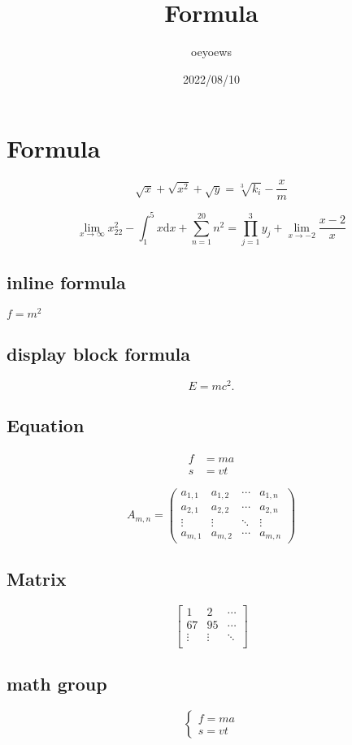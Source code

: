\documentclass{article}
\title{Formula}
\author{oeyoews}
\date{2022/08/10}
\begin{document}
\maketitle

\section{ Formula}%
\label{sec:Forum}

\[
	\sqrt{x} + \sqrt{x^2} +\sqrt{y} = \sqrt[3]{k_i} - \frac{x}{m}
\]

$$  \lim_{x \to \infty} x^2_{22} - \int_{1}^{5}x\mathrm{d}x + \sum_{n=1}^{20} n^{2} = \prod_{j=1}^{3} y_{j}  + \lim_{x \to -2} \frac{x-2}{x} $$

\subsection{inline formula}%
\label{sub:inline forum}

$f = m^2$

\subsection{display block formula}%
\label{sub:display block forum}

\[
	E = mc^2
	.\]

\subsection{Equation}%
\label{sec:equation}

\begin{align}
	f & = ma \\
	s & = vt
\end{align}

\begin{equation}
	A_{m,n} =
	\begin{pmatrix}
		a_{1,1} & a_{1,2} & \cdots & a_{1,n} \\
		a_{2,1} & a_{2,2} & \cdots & a_{2,n} \\
		\vdots  & \vdots  & \ddots & \vdots  \\
		a_{m,1} & a_{m,2} & \cdots & a_{m,n}
	\end{pmatrix}
\end{equation}

\subsection{Matrix}%
\label{sec:matrix}

$$\begin{bmatrix}
		1      & 2      & \cdots \\
		67     & 95     & \cdots \\
		\vdots & \vdots & \ddots \\
	\end{bmatrix}$$

\subsection{math group}%
\label{sec:math}

\begin{equation}
	\left\{
	\begin{aligned}
		f = ma \\
		s = vt
	\end{aligned}
\right.
\end{equation}
\end{document}
